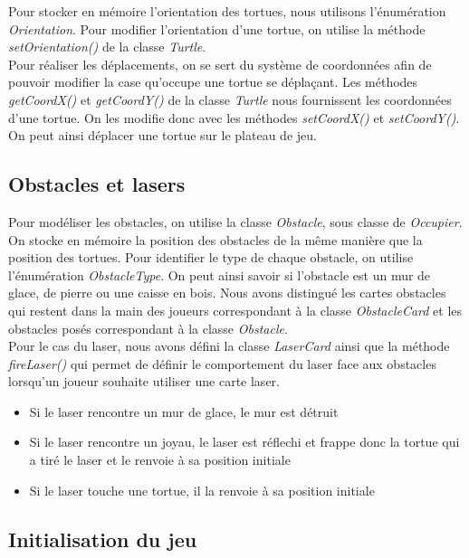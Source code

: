 \documentclass{article}
\begin{document}
\indent Pour stocker en mémoire l'orientation des tortues, nous utilisons l'énumération \textit{Orientation}. Pour modifier l'orientation d'une tortue, on utilise la méthode \textit{setOrientation()} de la classe \textit{Turtle}. \\

Pour réaliser les déplacements, on se sert du système de coordonnées afin de pouvoir modifier la case qu'occupe une tortue se déplaçant. Les méthodes \textit{getCoordX()} et \textit{getCoordY()} de la classe \textit{Turtle} nous fournissent les coordonnées d'une tortue. On les modifie donc avec les méthodes \textit{setCoordX()} et \textit{setCoordY()}. On peut ainsi déplacer une tortue sur le plateau de jeu.

	\subsection{Obstacles et lasers}

\indent Pour modéliser les obstacles, on utilise la classe \textit{Obstacle}, sous classe de \textit{Occupier}. On stocke en mémoire la position des obstacles de la même manière que la position des tortues. Pour identifier le type de chaque obstacle, on utilise l'énumération \textit{ObstacleType}. On peut ainsi savoir si l'obstacle est un mur de glace, de pierre ou une caisse en bois. Nous avons distingué les cartes obstacles qui restent dans la main des joueurs correspondant à la classe \textit{ObstacleCard} et les obstacles posés correspondant à la classe \textit{Obstacle}. \\
		
Pour le cas du laser, nous avons défini la classe \textit{LaserCard} ainsi que la méthode \textit{fireLaser()} qui permet de définir le comportement du laser face aux obstacles lorsqu'un joueur souhaite utiliser une carte laser. 
\begin{itemize}
\item Si le laser rencontre un mur de glace, le mur est détruit
\item Si le laser rencontre un joyau, le laser est réflechi et frappe donc la tortue qui a tiré le laser et le renvoie à sa position initiale
\item Si le laser touche une tortue, il la renvoie à sa position initiale
\end{itemize}

\newpage

	\subsection{Initialisation du jeu}
	
\end{document}

